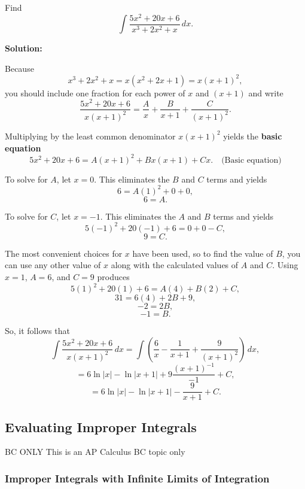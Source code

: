 \documentclass[12pt]{article}
\theoremstyle{beautifulthm}
\begin{document}
\begin{tcolorbox}[colback=examplebg, colframe=red!75!black, title=\textbf{EXAMPLE 2: Find the Integral of the Function}, fonttitle=\bfseries, sharp corners]
Find
\[
\int \frac{5x^2 + 20x + 6}{x^3 + 2x^2 + x} \, dx.
\]


\tcblower
\textbf{Solution:} 

Because
\[
x^3 + 2x^2 + x = x(x^2 + 2x + 1) = x(x + 1)^2,
\]
you should include one fraction for each power of $x$ and $(x + 1)$ and write
\[
\frac{5x^2 + 20x + 6}{x(x + 1)^2} = \frac{A}{x} + \frac{B}{x + 1} + \frac{C}{(x + 1)^2}.
\]

Multiplying by the least common denominator $x(x + 1)^2$ yields the \textbf{basic equation}
\[
5x^2 + 20x + 6 = A(x + 1)^2 + Bx(x + 1) + Cx. \quad \text{(Basic equation)}
\]

To solve for $A$, let $x = 0$. This eliminates the $B$ and $C$ terms and yields
\[
6 = A(1)^2 + 0 + 0,
\]
\[
6 = A.
\]

To solve for $C$, let $x = -1$. This eliminates the $A$ and $B$ terms and yields
\[
5(-1)^2 + 20(-1) + 6 = 0 + 0 - C,
\]
\[
9 = C.
\]

The most convenient choices for $x$ have been used, so to find the value of $B$, you can use any other value of $x$ along with the calculated values of $A$ and $C$. Using $x = 1$, $A = 6$, and $C = 9$ produces
\[
5(1)^2 + 20(1) + 6 = A(4) + B(2) + C,
\]
\[
31 = 6(4) + 2B + 9,
\]
\[
-2 = 2B,
\]
\[
-1 = B.
\]

So, it follows that
\[
\int \frac{5x^2 + 20x + 6}{x(x + 1)^2} \, dx = \int \left( \frac{6}{x} - \frac{1}{x + 1} + \frac{9}{(x + 1)^2} \right) \, dx,
\]
\[
= 6 \ln|x| - \ln|x + 1| + 9 \frac{(x + 1)^{-1}}{-1} + C,
\]
\[
= 6 \ln|x| - \ln|x + 1| - \frac{9}{x + 1} + C.
\]

\end{tcolorbox}

\subsection{Evaluating Improper
Integrals}
\begin{Note}{BC ONLY}{}
    This is an AP Calculus BC topic only
\end{Note}


\subsubsection{Improper Integrals with Infinite Limits of Integration}
\end{document}
